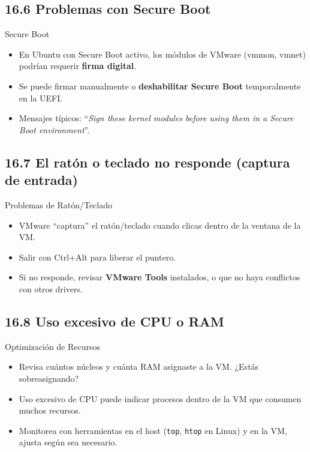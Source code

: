 \documentclass{beamer}
\begin{document}
\subsection{16.6 Problemas con Secure Boot}
\begin{frame}{Secure Boot}
    \begin{itemize}
        \item En Ubuntu con Secure Boot activo, los módulos de VMware (vmmon, vmnet) podrían requerir \textbf{firma digital}.
        \item Se puede firmar manualmente o \textbf{deshabilitar Secure Boot} temporalmente en la UEFI.
        \item Mensajes típicos: “\textit{Sign these kernel modules before using them in a Secure Boot environment}”.
    \end{itemize}
\end{frame}

\subsection{16.7 El ratón o teclado no responde (captura de entrada)}
\begin{frame}{Problemas de Ratón/Teclado}
    \begin{itemize}
        \item VMware “captura” el ratón/teclado cuando clicas dentro de la ventana de la VM.
        \item Salir con Ctrl+Alt para liberar el puntero.
        \item Si no responde, revisar \textbf{VMware Tools} instalados, o que no haya conflictos con otros drivers.
    \end{itemize}
\end{frame}

\subsection{16.8 Uso excesivo de CPU o RAM}
\begin{frame}{Optimización de Recursos}
    \begin{itemize}
        \item Revisa cuántos núcleos y cuánta RAM asignaste a la VM. ¿Estás sobreasignando?
        \item Uso excesivo de CPU puede indicar procesos dentro de la VM que consumen muchos recursos.
        \item Monitorea con herramientas en el host (\texttt{top}, \texttt{htop} en Linux) y en la VM, ajusta según sea necesario.
    \end{itemize}
\end{frame}
\end{document}
